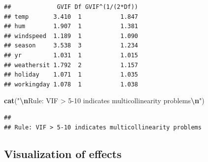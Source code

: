 \documentclass[
]{article}
\newenvironment{Shaded}{\begin{snugshade}}{\end{snugshade}}
\newcommand{\FunctionTok}[1]{\textcolor[rgb]{0.13,0.29,0.53}{\textbf{#1}}}
\newcommand{\NormalTok}[1]{#1}
\newcommand{\SpecialCharTok}[1]{\textcolor[rgb]{0.81,0.36,0.00}{\textbf{#1}}}
\newcommand{\StringTok}[1]{\textcolor[rgb]{0.31,0.60,0.02}{#1}}
\begin{document}
\begin{verbatim}
##             GVIF Df GVIF^(1/(2*Df))
## temp       3.410  1           1.847
## hum        1.907  1           1.381
## windspeed  1.189  1           1.090
## season     3.538  3           1.234
## yr         1.031  1           1.015
## weathersit 1.792  2           1.157
## holiday    1.071  1           1.035
## workingday 1.078  1           1.038
\end{verbatim}

\begin{Shaded}
\begin{Highlighting}[]
\FunctionTok{cat}\NormalTok{(}\StringTok{"}\SpecialCharTok{\textbackslash{}n}\StringTok{Rule: VIF \textgreater{} 5{-}10 indicates multicollinearity problems}\SpecialCharTok{\textbackslash{}n}\StringTok{"}\NormalTok{)}
\end{Highlighting}
\end{Shaded}

\begin{verbatim}
## 
## Rule: VIF > 5-10 indicates multicollinearity problems
\end{verbatim}

\subsection{Visualization of effects}\label{visualization-of-effects}
\end{document}
